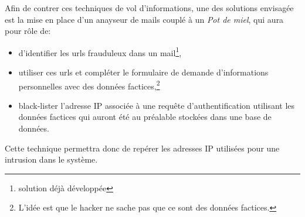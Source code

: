 Afin de contrer ces techniques de vol d'informations, une des solutions 
envisagée est la mise
en place d'un anayseur de mails couplé à un \emph{Pot de miel},
qui aura pour rôle de:
\begin{itemize}
	\item d'identifier les urls frauduleux dans un mail\footnote{solution 
			déjà développée},
	\item utiliser ces urls et compléter le formulaire de demande
		d'informations personnelles 
		avec des données factices,\footnote{L'idée est que le hacker 
		ne sache pas que ce sont des données factices.}
	\item black-lister l'adresse IP associée à une requête 
		d'authentification utilisant les données factices qui auront 
		été  au préalable stockées
		dans une base de données.
\end{itemize}

Cette technique permettra donc de repérer les adresses IP utilisées pour une 
intrusion  dans le système.

